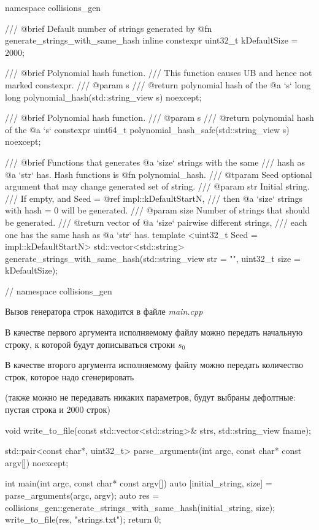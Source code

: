 \documentclass{report}
\begin{document}
\begin{cppcode}

namespace collisions_gen {

/// @brief Default number of strings generated by @fn generate_strings_with_same_hash
inline constexpr uint32_t kDefaultSize = 2000;

/// @brief Polynomial hash function.
///        This function causes UB and hence not marked constexpr.
/// @param s
/// @return polynomial hash of the @a `s`
long long polynomial_hash(std::string_view s) noexcept;

/// @brief Polynomial hash function.
/// @param s
/// @return polynomial hash of the @a `s`
constexpr uint64_t polynomial_hash_safe(std::string_view s) noexcept;

/// @brief Functions that generates @a `size` strings with the same
///        hash as @a `str` has. Hash functions is @fn polynomial_hash.
/// @tparam Seed optional argument that may change generated set of string.
/// @param str Initial string.
///            If empty, and Seed = @ref impl::kDefaultStartN,
///            then @a `size` strings with hash = 0 will be generated.
/// @param size Number of strings that should be generated.
/// @return vector of @a `size` pairwise different strings,
///         each one has the same hash as @a `str` has.
template <uint32_t Seed = impl::kDefaultStartN>
std::vector<std::string> generate_strings_with_same_hash(std::string_view str = "", 
uint32_t size = kDefaultSize);

}  // namespace collisions_gen

\end{cppcode}

Вызов генератора строк находится в файле \textit{main.cpp}

В качестве первого аргумента исполняемому файлу можно передать начальную строку, к которой будут дописываться строки $s_0$

В качестве второго аргумента исполняемому файлу можно передать количество строк, которое надо сгенерировать

(также можно не передавать никаких параметров, будут выбраны дефолтные: пустая строка и 2000 строк)

\begin{cppcode}

void write_to_file(const std::vector<std::string>& strs, std::string_view fname);

std::pair<const char*, uint32_t> parse_arguments(int argc, const char* const argv[]) noexcept;

int main(int argc, const char* const argv[]) {
    auto [initial_string, size] = parse_arguments(argc, argv);
    auto res = collisions_gen::generate_strings_with_same_hash(initial_string, size);
    write_to_file(res, "strings.txt");
    return 0;
}

\end{cppcode}
\end{document}
